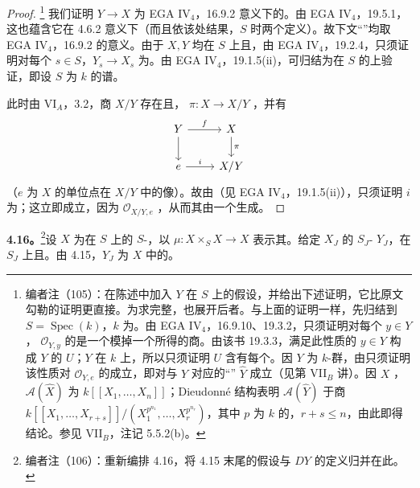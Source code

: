 \begin{proof}
\footnote{编者注（105）：在陈述中加入 $Y$ 在 $S$ 上的假设，并给出下述证明，它比原文勾勒的证明更直接。为求完整，也展开后者。与上面的证明一样，先归结到 $S=\operatorname{Spec}(k)$，$k$ 为。由 EGA IV$_4$，16.9.10、19.3.2，只须证明对每个 $y\in Y$， $\mathscr O_{Y,y}$ 的是一个模掉一个所得的商。由该书 19.3.3，满足此性质的 $y\in Y$ 构成 $Y$ 的 $U$；$Y$ 在 $k$ 上，所以只须证明 $U$ 含有每个。因 $Y$ 为 $k$-群，由只须证明该性质对 $\mathscr O_{Y,e}$ 的成立，即对与 $Y$ 对应的“” $\widehat Y$ 成立（见第 VII$_B$ 讲）。因 $X$ ， $\mathscr A(\widehat X)$ 为 $k[[X_1,\ldots,X_n]]$；Dieudonné 结构表明 $\mathscr A(\widehat Y)$ 于商 $k[[X_1,\ldots,X_{r+s}]]/(X_1^{p^{n_1}},\ldots,X_r^{p^{n_r}})$，其中 $p$ 为 $k$ 的，$r+s\leq n$，由此即得结论。参见 VII$_B$，注记 5.5.2(b)。}
我们证明 $Y\to X$ 为 EGA IV$_4$，16.9.2 意义下的。由 EGA IV$_4$，19.5.1，这也蕴含它在 4.6.2 意义下（而且依该处结果，$S$ 时两个定义）。故下文“”均取 EGA IV$_4$，16.9.2 的意义。由于 $X,Y$ 均在 $S$ 上且，由 EGA IV$_4$，19.2.4，只须证明对每个 $s\in S$，$Y_s\to X_s$ 为。由 EGA IV$_4$，19.1.5(ii)，可归结为在 $S$ 的上验证，即设 $S$ 为 $k$ 的谱。

此时由 VI$_A$，3.2，商 $X/Y$ 存在且， $\pi:X\to X/Y$ ，并有
\[
\begin{tikzcd}
Y\arrow[r,"f"]\arrow[d]&X\arrow[d,"\pi"]\\
e\arrow[r,"i"]&X/Y
\end{tikzcd}
\]
（$e$ 为 $X$ 的单位点在 $X/Y$ 中的像）。故由（见 EGA IV$_4$，19.1.5(ii)），只须证明 $i$ 为；这立即成立，因为 $\mathscr O_{X/Y,e}$ ，从而其由一个生成。
\end{proof}
\textbf{4.16。}\footnote{编者注（106）：重新编排 4.16，将 4.15 末尾的假设与 $DY$ 的定义归并在此。}设 $X$ 为在 $S$ 上的 $S$-，以 $\mu:X\times_S X\to X$ 表示其。给定 $X_J$ 的 $S_J$- $Y_J$，在 $S_J$ 上且。由 4.15，$Y_J$ 为 $X$ 中的。

